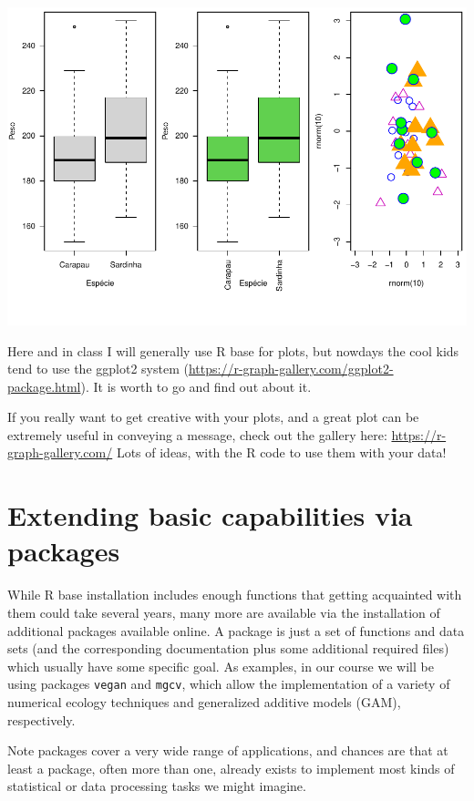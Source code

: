 \documentclass[
]{article}
\begin{document}
\includegraphics{TAMsIntro2RviaRStudioTutorial_files/figure-latex/unnamed-chunk-53-1.pdf}

Here and in class I will generally use R base for plots, but nowdays the
cool kids tend to use the ggplot2 system
(\url{https://r-graph-gallery.com/ggplot2-package.html}). It is worth to
go and find out about it.

If you really want to get creative with your plots, and a great plot can
be extremely useful in conveying a message, check out the gallery here:
\url{https://r-graph-gallery.com/} Lots of ideas, with the R code to use
them with your data!

\section{Extending basic capabilities via
packages}\label{extending-basic-capabilities-via-packages}

While R base installation includes enough functions that getting
acquainted with them could take several years, many more are available
via the installation of additional packages available online. A package
is just a set of functions and data sets (and the corresponding
documentation plus some additional required files) which usually have
some specific goal. As examples, in our course we will be using packages
\texttt{vegan} and \texttt{mgcv}, which allow the implementation of a
variety of numerical ecology techniques and generalized additive models
(GAM), respectively.

Note packages cover a very wide range of applications, and chances are
that at least a package, often more than one, already exists to
implement most kinds of statistical or data processing tasks we might
imagine.
\end{document}
